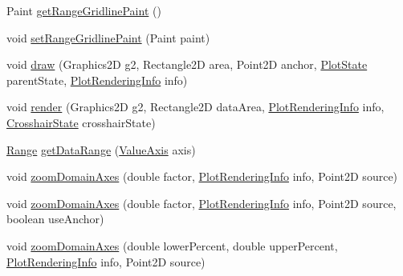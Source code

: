 \begin{DoxyCompactItemize}
\item 
Paint \mbox{\hyperlink{classorg_1_1jfree_1_1chart_1_1plot_1_1_fast_scatter_plot_afb960031ca8207656dcbd895221a3ed1}{get\+Range\+Gridline\+Paint}} ()
\item 
void \mbox{\hyperlink{classorg_1_1jfree_1_1chart_1_1plot_1_1_fast_scatter_plot_ac05c849d6e0f0e6b35a2f7e8ba0d8d43}{set\+Range\+Gridline\+Paint}} (Paint paint)
\item 
void \mbox{\hyperlink{classorg_1_1jfree_1_1chart_1_1plot_1_1_fast_scatter_plot_a94f56c50180379840f52e4efffb51e17}{draw}} (Graphics2D g2, Rectangle2D area, Point2D anchor, \mbox{\hyperlink{classorg_1_1jfree_1_1chart_1_1plot_1_1_plot_state}{Plot\+State}} parent\+State, \mbox{\hyperlink{classorg_1_1jfree_1_1chart_1_1plot_1_1_plot_rendering_info}{Plot\+Rendering\+Info}} info)
\item 
void \mbox{\hyperlink{classorg_1_1jfree_1_1chart_1_1plot_1_1_fast_scatter_plot_ada2e1f40be37988c5481418da791c256}{render}} (Graphics2D g2, Rectangle2D data\+Area, \mbox{\hyperlink{classorg_1_1jfree_1_1chart_1_1plot_1_1_plot_rendering_info}{Plot\+Rendering\+Info}} info, \mbox{\hyperlink{classorg_1_1jfree_1_1chart_1_1plot_1_1_crosshair_state}{Crosshair\+State}} crosshair\+State)
\item 
\mbox{\hyperlink{classorg_1_1jfree_1_1data_1_1_range}{Range}} \mbox{\hyperlink{classorg_1_1jfree_1_1chart_1_1plot_1_1_fast_scatter_plot_ac8cbf1df42548efb7ec92d0c148ab496}{get\+Data\+Range}} (\mbox{\hyperlink{classorg_1_1jfree_1_1chart_1_1axis_1_1_value_axis}{Value\+Axis}} axis)
\item 
void \mbox{\hyperlink{classorg_1_1jfree_1_1chart_1_1plot_1_1_fast_scatter_plot_a63b01d28b28252133fb877ee3a5bc1c6}{zoom\+Domain\+Axes}} (double factor, \mbox{\hyperlink{classorg_1_1jfree_1_1chart_1_1plot_1_1_plot_rendering_info}{Plot\+Rendering\+Info}} info, Point2D source)
\item 
void \mbox{\hyperlink{classorg_1_1jfree_1_1chart_1_1plot_1_1_fast_scatter_plot_a45c5c0d7ed65f1be28593c65a74757d0}{zoom\+Domain\+Axes}} (double factor, \mbox{\hyperlink{classorg_1_1jfree_1_1chart_1_1plot_1_1_plot_rendering_info}{Plot\+Rendering\+Info}} info, Point2D source, boolean use\+Anchor)
\item 
void \mbox{\hyperlink{classorg_1_1jfree_1_1chart_1_1plot_1_1_fast_scatter_plot_a0f98b8231152c36b8c4f1b6df06df922}{zoom\+Domain\+Axes}} (double lower\+Percent, double upper\+Percent, \mbox{\hyperlink{classorg_1_1jfree_1_1chart_1_1plot_1_1_plot_rendering_info}{Plot\+Rendering\+Info}} info, Point2D source)
\item 

\end{DoxyCompactItemize}
